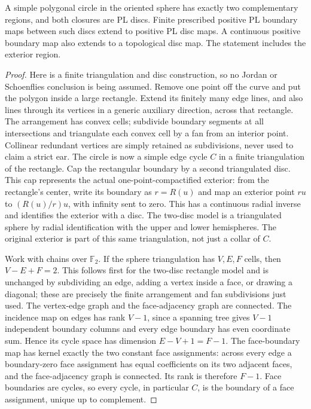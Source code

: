\begin{lemma}
\label{lem:gauss-two-discs}
A simple polygonal circle in the oriented sphere has exactly two
complementary regions, and both closures are PL discs. Finite prescribed
positive PL boundary maps between such discs extend to positive PL disc
maps. A continuous positive boundary map also extends to a topological
disc map. The statement includes the exterior region.
\end{lemma}
\begin{proof}
Here is a finite triangulation and disc construction, so no Jordan or
Schoenflies conclusion is being assumed. Remove one point off the curve
and put the polygon inside a large rectangle. Extend its finitely many
edge lines, and also lines through its vertices in a generic auxiliary
direction, across that rectangle. The arrangement has convex cells;
subdivide boundary segments at all intersections and triangulate each
convex cell by a fan from an interior point. Collinear redundant vertices
are simply retained as subdivisions, never used to claim a strict ear.
The circle is now a simple edge cycle $C$ in a finite triangulation of
the rectangle. Cap the rectangular boundary by a second triangulated disc.
This cap represents the actual one-point-compactified exterior: from
the rectangle's center, write its boundary as $r=R(u)$ and map an
exterior point $ru$ to $(R(u)/r)u$, with infinity sent to zero.
This has a continuous radial inverse and identifies the exterior with a
disc. The two-disc model is a triangulated sphere by radial identification
with the upper and lower hemispheres. The original exterior is part of this same
triangulation, not just a collar of $C$.

Work with chains over $\mathbb F_2$. If the sphere triangulation has
$V,E,F$ cells, then $V-E+F=2$. This follows first for the two-disc
rectangle model and is unchanged by subdividing an edge, adding a vertex
inside a face, or drawing a diagonal; these are precisely the finite
arrangement and fan subdivisions just used. The vertex-edge graph and
the face-adjacency graph are connected. The incidence map on edges has
rank $V-1$, since a spanning tree gives $V-1$ independent boundary
columns and every edge boundary has even coordinate sum. Hence its
cycle space has dimension $E-V+1=F-1$. The face-boundary map has
kernel exactly the two constant face assignments: across every edge a
boundary-zero face assignment has equal coefficients on its two adjacent
faces, and the face-adjacency graph is connected. Its rank is therefore
$F-1$. Face boundaries are cycles, so every cycle, in particular $C$,
is the boundary of a face assignment, unique up to complement.


\end{proof}
